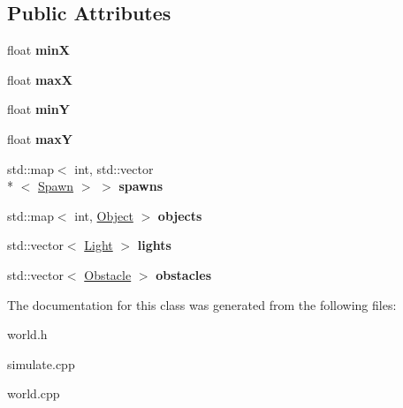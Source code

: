 \subsection*{Public Attributes}
\begin{DoxyCompactItemize}
\item 
\hypertarget{class_world_a8d19d75e0614c854451eeb80f9a6c7df}{float {\bfseries min\-X}}\label{class_world_a8d19d75e0614c854451eeb80f9a6c7df}

\item 
\hypertarget{class_world_a1e5b91987fe382083580ddd3889bad85}{float {\bfseries max\-X}}\label{class_world_a1e5b91987fe382083580ddd3889bad85}

\item 
\hypertarget{class_world_a821cc5789d4eeeb7839ab3057de1da53}{float {\bfseries min\-Y}}\label{class_world_a821cc5789d4eeeb7839ab3057de1da53}

\item 
\hypertarget{class_world_a7a42a8e4b171bedd927dfa6ae018e96e}{float {\bfseries max\-Y}}\label{class_world_a7a42a8e4b171bedd927dfa6ae018e96e}

\item 
\hypertarget{class_world_a4ed3ad3160ad21a961c010dc2d10c4cf}{std\-::map$<$ int, std\-::vector\\*
$<$ \hyperlink{class_spawn}{Spawn} $>$ $>$ {\bfseries spawns}}\label{class_world_a4ed3ad3160ad21a961c010dc2d10c4cf}

\item 
\hypertarget{class_world_aa7f46be731fc0dd306f7f7d12c2407c2}{std\-::map$<$ int, \hyperlink{class_object}{Object} $>$ {\bfseries objects}}\label{class_world_aa7f46be731fc0dd306f7f7d12c2407c2}

\item 
\hypertarget{class_world_ab97ac12fd82256884dbbbd09a18d01c4}{std\-::vector$<$ \hyperlink{class_light}{Light} $>$ {\bfseries lights}}\label{class_world_ab97ac12fd82256884dbbbd09a18d01c4}

\item 
\hypertarget{class_world_acaee24cc3256bf5bc39147a326520655}{std\-::vector$<$ \hyperlink{class_obstacle}{Obstacle} $>$ {\bfseries obstacles}}\label{class_world_acaee24cc3256bf5bc39147a326520655}

\end{DoxyCompactItemize}


The documentation for this class was generated from the following files\-:\begin{DoxyCompactItemize}
\item 
world.\-h\item 
simulate.\-cpp\item 
world.\-cpp\end{DoxyCompactItemize}
